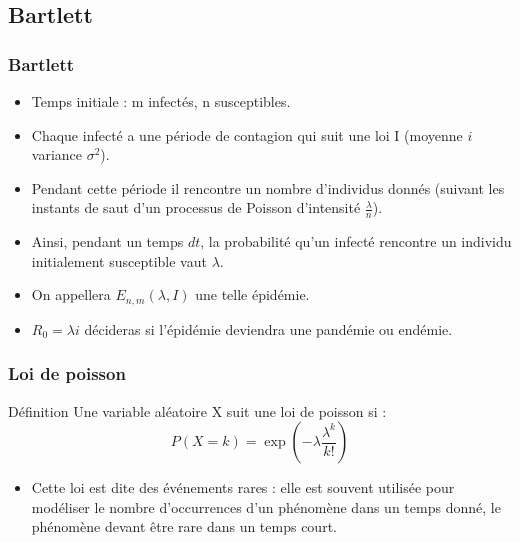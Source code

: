 \subsection{Bartlett}

\begin{frame}
    \frametitle{Bartlett}

    \begin{itemize}
        \item Temps initiale : m infectés, n susceptibles.
        \item Chaque infecté a une période de contagion qui suit une loi I (moyenne $i$ variance $\sigma^2$).
        \item Pendant cette période il rencontre un nombre d'individus donnés (suivant les instants de saut d’un processus de Poisson d’intensité $\frac{\lambda}{n}$).
    \end{itemize}
\end{frame}

\begin{frame}
    \begin{itemize}
        \item Ainsi, pendant un temps $dt$, la probabilité qu’un infecté rencontre un individu initialement susceptible vaut $\lambda$.
        \item On appellera $E_{n,m}(\lambda, I)$ une telle épidémie.
        \item $R_0 = \lambda i$ décideras si l'épidémie deviendra une pandémie ou endémie.
    \end{itemize}

\end{frame}

\begin{frame}
    \frametitle{Loi de poisson}

    \begin{block}{Définition}
        Une variable aléatoire X suit une loi de poisson si :
        $$ P(X=k) = \exp(-\lambda \frac{\lambda^k}{k!}) $$
    \end{block}

    \begin{itemize}
        \item Cette loi est dite des événements rares : elle est souvent utilisée pour modéliser le nombre d'occurrences d'un phénomène dans un temps donné, le phénomène devant être rare dans un temps court.
    \end{itemize}

\end{frame}
